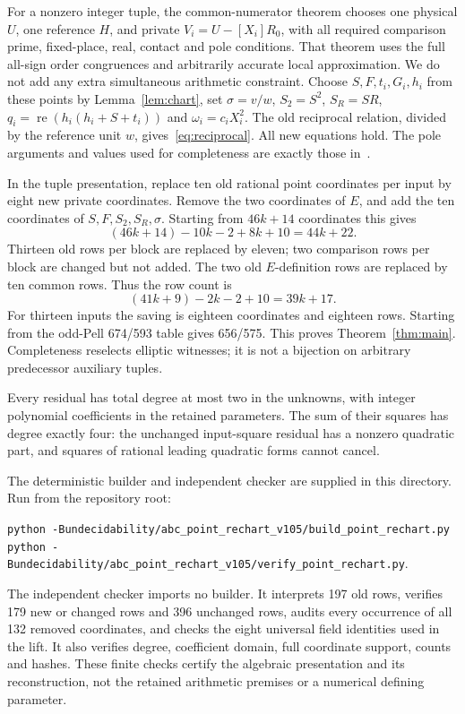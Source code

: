 \documentclass[11pt]{article}
\newcommand{\re}{\operatorname{re}}
\begin{document}
For a nonzero integer tuple, the common-numerator theorem
\cite[Lemma 3]{common} chooses one physical \(U\), one reference
\(H\), and private \(V_i=U-[X_i]R_0\), with all required comparison
prime, fixed-place, real, contact and pole conditions. That theorem
uses the full all-sign order congruences and arbitrarily accurate local
approximation. We do not add any extra simultaneous arithmetic
constraint. Choose \(S,F,t_i,G_i,h_i\) from these points by
Lemma~\ref{lem:chart}, set \(\sigma=v/w\), \(S_2=S^2\),
\(S_R=SR\), \(q_i=\re(h_i(h_i+S+t_i))\) and
\(\omega_i=c_iX_i^2\). The old reciprocal relation, divided by
the reference unit \(w\), gives~\eqref{eq:reciprocal}. All new
equations hold. The pole arguments and values used for completeness
are exactly those in~\cite{common}.

In the tuple presentation, replace ten old rational point coordinates
per input by eight new private coordinates. Remove the two coordinates
of \(E\), and add the ten coordinates of \(S,F,S_2,S_R,\sigma\).
Starting from \(46k+14\) coordinates this gives
\[
       (46k+14)-10k-2+8k+10=44k+22.
\]
Thirteen old rows per block are replaced by eleven; two comparison
rows per block are changed but not added. The two old \(E\)-definition
rows are replaced by ten common rows. Thus the row count is
\[
                   (41k+9)-2k-2+10=39k+17.
\]
For thirteen inputs the saving is eighteen coordinates and eighteen
rows. Starting from the odd-Pell 674/593 table gives 656/575. This
proves Theorem~\ref{thm:main}. Completeness reselects elliptic
witnesses; it is not a bijection on arbitrary predecessor auxiliary
tuples.

Every residual has total degree at most two in the unknowns, with
integer polynomial coefficients in the retained parameters. The sum
of their squares has degree exactly four: the unchanged input-square
residual has a nonzero quadratic part, and squares of rational leading
quadratic forms cannot cancel.

The deterministic builder and independent checker are supplied in
this directory. Run from the repository root:
\begin{center}\small
\texttt{python -B}\enspace\nolinkurl{undecidability/abc_point_rechart_v105/build_point_rechart.py}\\
\texttt{python -B}\enspace\nolinkurl{undecidability/abc_point_rechart_v105/verify_point_rechart.py}.
\end{center}
The independent checker imports no builder. It interprets 197 old
rows, verifies 179 new or changed rows and 396 unchanged rows, audits
every occurrence of all 132 removed coordinates, and checks the eight
universal field identities used in the lift. It also verifies degree,
coefficient domain, full coordinate support, counts and hashes. These
finite checks certify the algebraic presentation and its reconstruction,
not the retained arithmetic premises or a numerical defining parameter.
\end{document}
